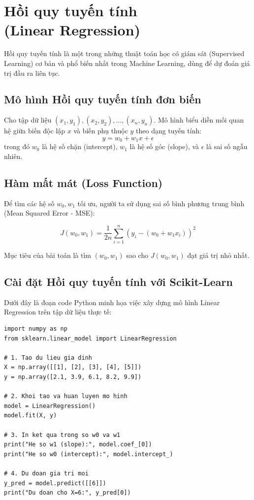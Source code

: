 \chapter{Hồi quy tuyến tính \\ (Linear Regression)}
Hồi quy tuyến tính là một trong những thuật toán học có giám sát (Supervised Learning) cơ bản và phổ biến nhất trong Machine Learning, dùng để dự đoán giá trị đầu ra liên tục.

\section{Mô hình Hồi quy tuyến tính đơn biến}

\begin{definition}
Cho tập dữ liệu $(x_1, y_1), (x_2, y_2), \dots, (x_n, y_n)$. Mô hình biểu diễn mối quan hệ giữa biến độc lập $x$ và biến phụ thuộc $y$ theo dạng tuyến tính:
\begin{equation}
    y = w_0 + w_1 x + \epsilon
\end{equation}
trong đó $w_0$ là hệ số chặn (intercept), $w_1$ là hệ số góc (slope), và $\epsilon$ là sai số ngẫu nhiên.
\end{definition}

\section{Hàm mất mát (Loss Function)}

Để tìm các hệ số $w_0, w_1$ tối ưu, người ta sử dụng sai số bình phương trung bình (Mean Squared Error - MSE):

\begin{equation}
    J(w_0, w_1) = \frac{1}{2n} \sum_{i=1}^{n} \left( y_i - (w_0 + w_1 x_i) \right)^2
\end{equation}

Mục tiêu của bài toán là tìm $(w_0, w_1)$ sao cho $J(w_0, w_1)$ đạt giá trị nhỏ nhất.

\section{Cài đặt Hồi quy tuyến tính với Scikit-Learn}

Dưới đây là đoạn code Python minh họa việc xây dựng mô hình Linear Regression trên tập dữ liệu thực tế:

\begin{lstlisting}[caption={Thực thi Linear Regression bằng Scikit-Learn}]
import numpy as np
from sklearn.linear_model import LinearRegression

# 1. Tao du lieu gia dinh
X = np.array([[1], [2], [3], [4], [5]])
y = np.array([2.1, 3.9, 6.1, 8.2, 9.9])

# 2. Khoi tao va huan luyen mo hinh
model = LinearRegression()
model.fit(X, y)

# 3. In ket qua trong so w0 va w1
print("He so w1 (slope):", model.coef_[0])
print("He so w0 (intercept):", model.intercept_)

# 4. Du doan gia tri moi
y_pred = model.predict([[6]])
print("Du doan cho X=6:", y_pred[0])
\end{lstlisting}

